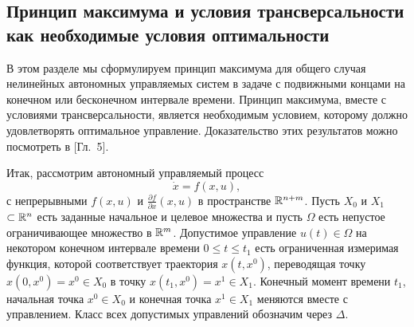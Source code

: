 \subsection{Принцип максимума и условия трансверсальности как необходимые условия оптимальности}

В этом разделе мы сформулируем принцип максимума для общего случая нелинейных автономных управляемых систем в задаче с подвижными концами на конечном или бесконечном интервале времени. Принцип максимума, вместе с условиями трансверсальности, является необходимым условием, которому должно удовлетворять оптимальное управление. Доказательство этих результатов можно посмотреть в \cite{li}[Гл.~5].
        
Итак, рассмотрим автономный управляемый процесс
$$
        \dot x = f(x, u),
$$
с непрерывными $f(x, u)$ и $\frac{\partial f}{\partial x}(x, u)$ в пространстве $\mathbb{R}^{n+m}$. Пусть $X_0$ и $X_1$ $\subset \mathbb{R}^n$ есть заданные начальное и целевое множества и пусть $\Omega$ есть непустое ограничивающее множество в $\mathbb{R}^m$. Допустимое управление $u(t) \in \Omega$ на некотором конечном интервале времени $0 \leqslant t \leqslant t_1$ есть ограниченная измеримая функция, которой соответствует траектория $x(t, x^0)$, переводящая точку $x(0, x^0) = x^0 \in X_0$ в точку $x(t_1, x^0) = x^1 \in X_1$. Конечный момент времени $t_1$, начальная точка $x^0 \in X_0$ и конечная точка $x^1 \in X_1$ меняются вместе с управлением. Класс всех допустимых управлений обозначим через $\Delta$.
        

